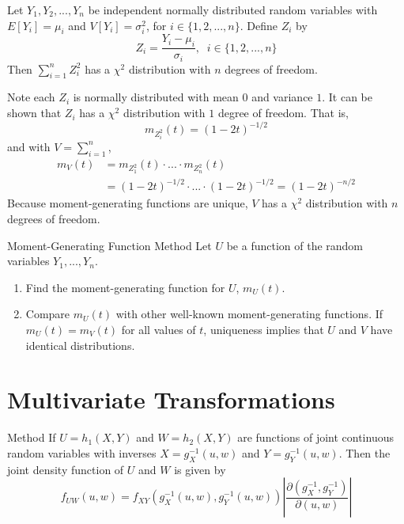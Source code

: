 \documentclass[12pt, a4paper, twoside, openright, titlepage]{book}
\begin{document}
\begin{thm}{}{}
    Let $Y_1,Y_2,...,Y_n$ be independent normally distributed random variables with $E[Y_i] = \mu_i$ and $V[Y_i] = \sigma_i^2$, for $i \in \{1,2,...,n\}$. Define $Z_i$ by \begin{equation*}
        Z_i = \frac{Y_i - \mu_i}{\sigma_i},\;\;i\in\{1,2,...,n\}
    \end{equation*}
    Then $\sum\limits_{i=1}^nZ_i^2$ has a $\chi^2$ distribution with $n$ degrees of freedom.
\end{thm}
\begin{proof*}{}{}
    Note each $Z_i$ is normally distributed with mean $0$ and variance $1$. It can be shown that $Z_i$ has a $\chi^2$ distribution with $1$ degree of freedom. That is, \begin{equation*}
        m_{Z_i^2}(t) = (1-2t)^{-1/2}
    \end{equation*}
    and with $V = \sum\limits_{i=1}^n$, \begin{align*}
        m_V(t) &= m_{Z_1^2}(t)\cdot ... \cdot m_{Z_n^2}(t) \\
        &= (1-2t)^{-1/2} \cdot ...\cdot (1-2t)^{-1/2} = (1-2t)^{-n/2}
    \end{align*}
    Because moment-generating functions are unique, $V$ has a $\chi^2$ distribution with $n$ degrees of freedom.
\end{proof*}

\begin{defn}{Moment-Generating Function Method}{}
    Let $U$ be a function of the random variables $Y_1,...,Y_n$. \begin{enumerate}
        \item Find the moment-generating function for $U$, $m_U(t)$.
        \item Compare $m_U(t)$ with other well-known moment-generating functions. If $m_U(t) = m_V(t)$ for all values of $t$, uniqueness implies that $U$ and $V$ have identical distributions.
    \end{enumerate}
\end{defn}


\section{\textsection Multivariate Transformations}

\begin{defn}{Method}{}
    If $U = h_1(X,Y)$ and $W = h_2(X,Y)$ are functions of joint continuous random variables with inverses $X = g_X^{-1}(u,w)$ and $Y = g_Y^{-1}(u,w)$. Then the joint density function of $U$ and $W$ is given by \begin{equation*}
        f_{UW}(u,w) = f_{XY}(g_X^{-1}(u,w),g_Y^{-1}(u,w))\left|\frac{\partial(g_X^{-1},g_Y^{-1})}{\partial(u,w)}\right|
    \end{equation*}
\end{defn}
\end{document}
